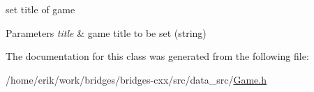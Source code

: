 set title of game 
\begin{DoxyParams}{Parameters}
{\em title} & game title to be set (string) \\
\hline
\end{DoxyParams}


The documentation for this class was generated from the following file\+:\begin{DoxyCompactItemize}
\item 
/home/erik/work/bridges/bridges-\/cxx/src/data\+\_\+src/\hyperlink{_game_8h}{Game.\+h}\end{DoxyCompactItemize}
